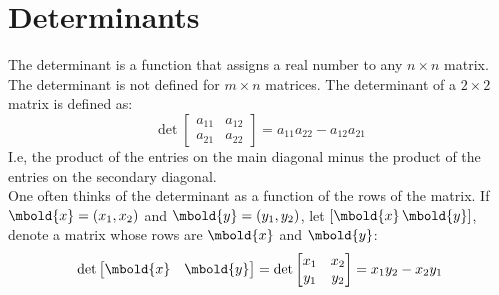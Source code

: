 \documentclass[12pt letter]{report}
\begin{document}
\section{Determinants}

The determinant is a function that assigns a real number to any $n\times n$ matrix. The determinant is not defined for $m\times n$ matrices.
The determinant of a $2\times 2$ matrix is defined as:
\[
  \det \begin{bmatrix}
    a_{11} & a_{12} \\
    a_{21} & a_{22}
  \end{bmatrix}  = a_{11}a_{22} - a_{12}a_{21}
\]
I.e, the product of the entries on the main diagonal minus the product of the entries on the secondary diagonal. \\
One often thinks of the determinant as a function of the rows of the matrix. If $\mbold{x} = \left( x_1, x_2 \right) $ and $\mbold{y} = \left( y_1, y_2 \right) $, let $ \left[ \mbold{x} \,\mbold{y} \right] $, denote a matrix whose rows are $\mbold{x}$ and $\mbold{y}$:
\[
  \det \begin{bmatrix} \mbold{x} & \mbold{y} \end{bmatrix} = \det \begin{bmatrix}
    x_1 & x_2 \\
    y_1 & y_2
  \end{bmatrix} = x_1y_2 - x_2y_1
\]
\end{document}
